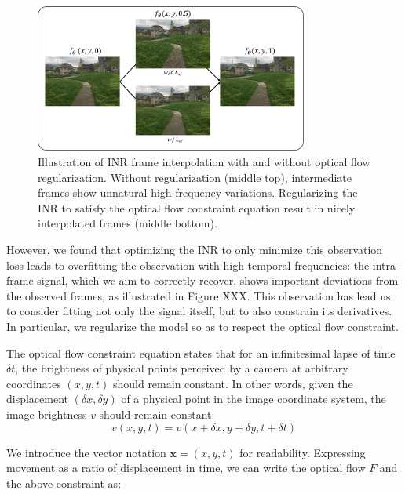 \documentclass{article}
\begin{document}
\begin{figure}[t]
\centering
\includegraphics[width=0.8\textwidth]{"w_wo_OF"}
\caption{Illustration of INR frame interpolation with and without optical flow regularization.
Without regularization (middle top), intermediate frames show unnatural high-frequency variations.
Regularizing the INR to satisfy the optical flow constraint equation result in nicely interpolated frames (middle bottom).
}
\label{fig_w_wo_OF}
\end{figure}

However, we found that optimizing the INR to only minimize this observation loss leads to overfitting the observation with high temporal frequencies:
the intra-frame signal, which we aim to correctly recover, shows important deviations from the observed frames, as illustrated in Figure XXX.
This observation has lead us to consider fitting not only the signal itself, but to also constrain its derivatives.
In particular, we regularize the model so as to respect the optical flow constraint.


The optical flow constraint equation states that for an infinitesimal lapse of time $\delta t$,
the brightness of physical points perceived by a camera at arbitrary coordinates $(x,y,t)$ should remain constant.
In other words, given the displacement $(\delta x, \delta y)$ of a physical point in the image coordinate system,
the image brightness $v$ should remain constant:
\begin{equation}
v(x, y, t)=v(x + \delta x, y + \delta y, t + \delta t)
\end{equation}

We introduce the vector notation $\textbf{x}=(x,y,t)$ for readability.
Expressing movement as a ratio of displacement in time,
we can write the optical flow $F$ and the above constraint as:
\end{document}
